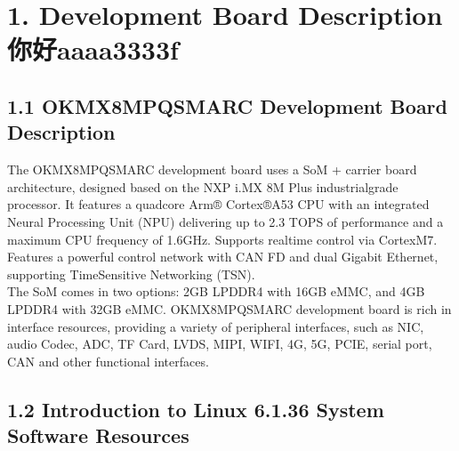 \documentclass[letterpaper,10pt,openany,english]{sphinxmanual}
\begin{document}
\pagestyle{plain}
\sphinxtableofcontents
\pagestyle{normal}
\label{\detokenize{linux-manual::doc}}



\chapter{1. Development Board Description你好aaaa3333f}
\label{\detokenize{linux-manual:development-board-descriptionaaaa3333f}}

\section{1.1 OK\sphinxhyphen{}MX8MPQ\sphinxhyphen{}SMARC Development Board Description}
\label{\detokenize{linux-manual:ok-mx8mpq-smarc-development-board-description}}
\sphinxAtStartPar
The OK\sphinxhyphen{}MX8MPQ\sphinxhyphen{}SMARC development board uses a SoM + carrier board architecture, designed based on the NXP i.MX 8M Plus industrial\sphinxhyphen{}grade processor. It features a quad\sphinxhyphen{}core Arm® Cortex®\sphinxhyphen{}A53 CPU with an integrated Neural Processing Unit (NPU) delivering up to 2.3 TOPS of performance and a maximum CPU frequency of 1.6GHz. Supports real\sphinxhyphen{}time control via Cortex\sphinxhyphen{}M7. Features a powerful control network with CAN FD and dual Gigabit Ethernet, supporting Time\sphinxhyphen{}Sensitive Networking (TSN).\\
The SoM comes in two options: 2GB LPDDR4 with 16GB eMMC, and 4GB LPDDR4 with 32GB eMMC. OK\sphinxhyphen{}MX8MPQ\sphinxhyphen{}SMARC development board is rich in interface resources, providing a variety of peripheral interfaces, such as NIC, audio Codec, ADC, TF Card, LVDS, MIPI, WIFI, 4G, 5G, PCIE, serial port, CAN and other functional interfaces.

\sphinxAtStartPar
{}

\sphinxAtStartPar
{}

\sphinxAtStartPar
{}


\section{1.2 Introduction to Linux 6.1.36 System Software Resources}
\label{\detokenize{linux-manual:introduction-to-linux-6-1-36-system-software-resources}}
\end{document}
